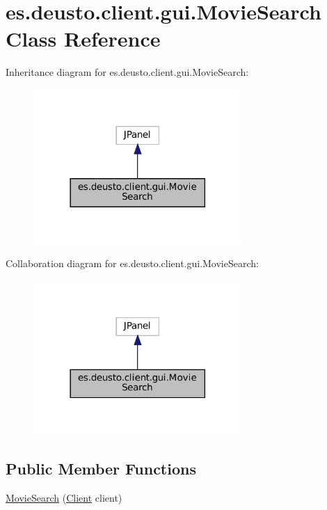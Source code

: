 \hypertarget{classes_1_1deusto_1_1client_1_1gui_1_1_movie_search}{}\section{es.\+deusto.\+client.\+gui.\+Movie\+Search Class Reference}
\label{classes_1_1deusto_1_1client_1_1gui_1_1_movie_search}


Inheritance diagram for es.\+deusto.\+client.\+gui.\+Movie\+Search\+:
\nopagebreak
\begin{figure}[H]
\begin{center}
\leavevmode
\includegraphics[width=225pt]{classes_1_1deusto_1_1client_1_1gui_1_1_movie_search__inherit__graph}
\end{center}
\end{figure}


Collaboration diagram for es.\+deusto.\+client.\+gui.\+Movie\+Search\+:
\nopagebreak
\begin{figure}[H]
\begin{center}
\leavevmode
\includegraphics[width=225pt]{classes_1_1deusto_1_1client_1_1gui_1_1_movie_search__coll__graph}
\end{center}
\end{figure}
\subsection*{Public Member Functions}
\begin{DoxyCompactItemize}
\item 
\mbox{\hyperlink{classes_1_1deusto_1_1client_1_1gui_1_1_movie_search_a20d7badf9735287b4da03a9eb3cf09f4}{Movie\+Search}} (\mbox{\hyperlink{classes_1_1deusto_1_1client_1_1_client}{Client}} client)
\end{DoxyCompactItemize}


